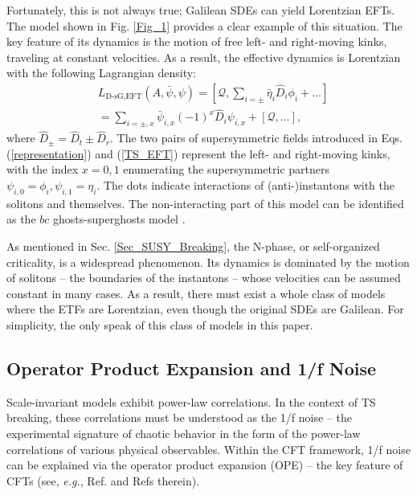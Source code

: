 \documentclass[final,5p,10pt,times,twocolumn,year]{elsarticle}
\begin{document}
Fortunately, this is not always true; Galilean SDEs can yield Lorentzian EFTs. The model shown in Fig. \ref{Fig_1} provides a clear example of this situation. The key feature of its dynamics is the motion of free left- and right-moving kinks, traveling at constant velocities. As a result, the effective dynamics is Lorentzian with the following Lagrangian density:
\begin{eqnarray}
    &L_\text{D-sG,EFT}(A,\bar\psi,\psi) = [\mathcal{Q}, \sum\nolimits_{i=\pm} \bar\eta_{i}\hat D_i \phi_{i} + ...] \nonumber \\ &= \sum\nolimits_{i=\pm, x} \bar\psi_{i,x} (-1)^x\hat D_i \psi_{i,x} + [\mathcal{Q}, ...],\label{DsG_EFT}
\end{eqnarray}
where $\hat D_\pm = \hat D_t \pm \hat D_r$. The two pairs of supersymmetric fields introduced in Eqs. (\ref{representation}) and (\ref{TS_EFT}) represent the left- and right-moving kinks, with the index $x=0,1$ enumerating the supersymmetric partners $\psi_{i,0} = \phi_i,\psi_{i,1} = \eta_i$. The dots indicate interactions of (anti-)instantons with the solitons and themselves. The non-interacting part of this model can be identified as the $bc$ ghosts-superghosts model \cite{MARTINEC1988249,ALVAREZGAUME1988455,kausch1995curiositiesc2}.

As mentioned in Sec. \ref{Sec_SUSY_Breaking}, the N-phase, or self-organized criticality, is a widespread phenomenon. Its dynamics is dominated by the motion of solitons -- the boundaries of the instantons -- whose velocities can be assumed constant in many cases. As a result, there must exist a whole class of models where the ETFs are Lorentzian, even though the original SDEs are Galilean. For simplicity, the only speak of this class of models in this paper.

\subsection{Operator Product Expansion and 1/f Noise}
\label{Sec:OPE}
Scale-invariant models exhibit power-law correlations. In the context of TS breaking, these correlations must be understood as the 1/f noise -- the experimental signature of chaotic behavior in the form of the power-law correlations of various physical observables. Within the CFT framework, 1/f noise can be explained via the operator product expansion (OPE) -- the key feature of CFTs (see, \emph{e.g.}, Ref.\cite{ginsparg1988appliedconformalfieldtheory} and Refs therein).
\end{document}
